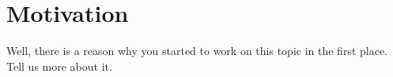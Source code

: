 
\section{Motivation} %
\label{sec:motivation}


Well, there is a reason why you started to work on this topic in the first place.
Tell us more about it.


\lipsum[1-9]


